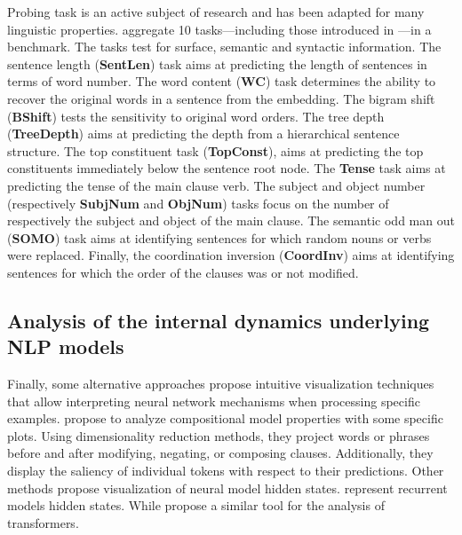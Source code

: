 Probing task is an active subject of research and has been adapted for many linguistic properties. \textcite{baroni_18} aggregate 10 tasks—including those introduced in \textcite{adi_17}—in a benchmark. The tasks test for surface, semantic and syntactic information. The sentence length (\textbf{SentLen}) task aims at predicting the length of sentences in terms of word number. The word content (\textbf{WC}) task determines the ability to recover the original words in a sentence from the embedding. The bigram shift (\textbf{BShift}) tests the sensitivity to original word orders. The tree depth (\textbf{TreeDepth}) aims at predicting the depth from a hierarchical sentence structure. The top constituent task (\textbf{TopConst}), aims at predicting the top constituents immediately below the sentence root node. The \textbf{Tense} task aims at predicting the tense of the main clause verb. The subject and object number (respectively \textbf{SubjNum} and \textbf{ObjNum}) tasks focus on the number of respectively the subject and object of the main clause. The semantic odd man out (\textbf{SOMO}) task aims at identifying sentences for which random nouns or verbs were replaced. Finally, the coordination inversion (\textbf{CoordInv}) aims at identifying sentences for which the order of the clauses was or not modified.






\subsection{Analysis of the internal dynamics underlying NLP models}

Finally, some alternative approaches propose intuitive visualization techniques that allow interpreting neural network mechanisms when processing specific examples. \textcite{li_16} propose to analyze compositional model properties with some specific plots. Using dimensionality reduction methods, they project words or phrases before and after modifying, negating, or composing clauses. Additionally, they display the saliency of individual tokens with respect to their predictions. Other methods propose visualization of neural model hidden states. \textcite{strobelt_18} represent recurrent models hidden states. While \textcite{hoover_19} propose a similar tool for the analysis of transformers.

